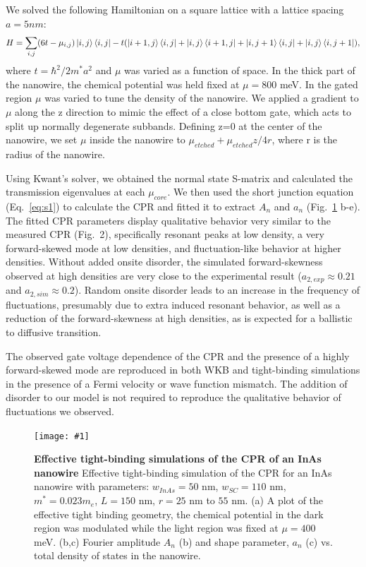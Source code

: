 \documentclass[11pt]{article}
\newcommand{\fig}[5]{
	\begin{figure}
	\centerline{\texttt{[image: \#1]}}
\caption[#3]{\label{#2} \textbf{#3} #4}
\end{figure}}
\begin{document}
We solved the following Hamiltonian on a square lattice with a lattice spacing $a = 5nm$:
\begin{equation}\label{eq:s3}
H= \sum_{i,j} (6t - \mu_{i,j}) \ket{i,j}\bra{i,j} - t (\ket{i+1,j}\bra{i,j}+ \ket{i,j}\bra{i+1,j}+\ket{i,j+1}\bra{i,j}+\ket{i,j}\bra{i,j+1}), 
\end{equation} where $t=\hbar^2 / 2 m^* a^2$ and $\mu$ was varied as a function of space. In the thick part of the nanowire, the chemical potential was held fixed at $\mu = 800$ meV. In the gated region $\mu$ was varied to tune the density of the nanowire. We applied a gradient to $\mu$ along the z direction to mimic the effect of a close bottom gate, which acts to split up normally degenerate subbands. Defining z=0 at the center of the nanowire, we set $\mu$ inside the nanowire to $\mu_{etched}+\mu_{etched} z/4r$, where r is the radius of the nanowire. 

Using Kwant's solver, we obtained the normal state S-matrix and calculated the transmission eigenvalues at each $\mu_{core}$. We then used the short junction equation (Eq.~\ref{eq:s1}) to calculate the CPR and fitted it to extract $A_n$ and $a_n$ (Fig.~\ref{fig:kwant} b-e). The fitted CPR parameters display qualitative behavior very similar to the measured CPR (Fig.~2), specifically resonant peaks at low density, a very forward-skewed mode at low densities, and fluctuation-like behavior at higher densities. Without added onsite disorder, the simulated forward-skewness observed at high densities are very close to the experimental result ($a_{2,exp} \approx 0.21$ and $a_{2,sim} \approx 0.2$). Random onsite disorder leads to an increase in the frequency of fluctuations, presumably due to extra induced resonant behavior, as well as a reduction of the forward-skewness at high densities, as is expected for a ballistic to diffusive transition.

The observed gate voltage dependence of the CPR and the presence of a highly forward-skewed mode are reproduced in both WKB and tight-binding simulations in the presence of a Fermi velocity or wave function mismatch. The addition of disorder to our model is not required to reproduce the qualitative behavior of fluctuations we observed.

\fig{./kwant_fig.pdf}{fig:kwant}
{Effective tight-binding simulations of the CPR of an InAs nanowire}
{Effective tight-binding simulation of the CPR for an InAs nanowire with parameters: $w_{InAs} = 50$ nm, $w_{SC} = 110$ nm, $m^* = 0.023 m_e$, $L = 150$ nm, $r=25$ nm to $55$ nm. (a) A plot of the effective tight binding geometry, the chemical potential in the  dark region was modulated while the light region was fixed at $\mu = 400$ meV. (b,c) Fourier amplitude $A_n$ (b) and shape parameter, $a_n$ (c) vs. total density of states in the nanowire.}{0.68}
\end{document}

